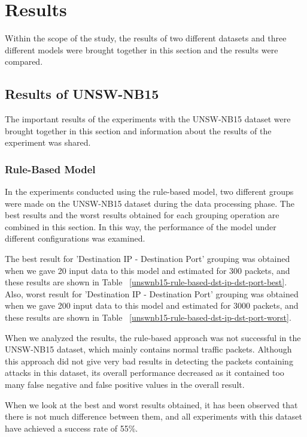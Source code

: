 \documentclass{article}
\begin{document}
\section{Results}

Within the scope of the study, the results of two different datasets and three different models were brought together in this section and the results were compared.

\subsection{Results of UNSW-NB15}

The important results of the experiments with the UNSW-NB15 dataset were brought together in this section and information about the results of the experiment was shared.

\subsubsection{Rule-Based Model}

In the experiments conducted using the rule-based model, two different groups were made on the UNSW-NB15 dataset during the data processing phase. The best results and the worst results obtained for each grouping operation are combined in this section. In this way, the performance of the model under different configurations was examined.

The best result for 'Destination IP - Destination Port' grouping was obtained when we gave 20 input data to this model and estimated for 300 packets, and these results are shown in Table ~\ref{unswnb15-rule-based-dst-ip-dst-port-best}. Also, worst result for 'Destination IP - Destination Port' grouping was obtained when we gave 200 input data to this model and estimated for 3000 packets, and these results are shown in Table ~\ref{unswnb15-rule-based-dst-ip-dst-port-worst}.

When we analyzed the results, the rule-based approach was not successful in the UNSW-NB15 dataset, which mainly contains normal traffic packets. Although this approach did not give very bad results in detecting the packets containing attacks in this dataset, its overall performance decreased as it contained too many false negative and false positive values in the overall result. 

When we look at the best and worst results obtained, it has been observed that there is not much difference between them, and all experiments with this dataset have achieved a success rate of 55\%.
\end{document}
